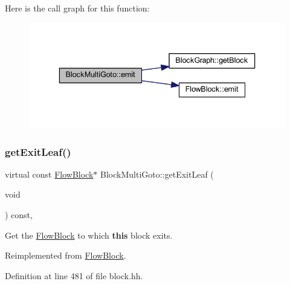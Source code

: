 Here is the call graph for this function\+:
\nopagebreak
\begin{figure}[H]
\begin{center}
\leavevmode
\includegraphics[width=336pt]{class_block_multi_goto_a8eee38e26a13873ceaff6d37b46eaafd_cgraph}
\end{center}
\end{figure}
\mbox{\label{class_block_multi_goto_a54ba810882911521ff2ca84b6458228a}} 
\subsubsection{\texorpdfstring{getExitLeaf()}{getExitLeaf()}}
{\footnotesize\ttfamily virtual const \mbox{\hyperlink{class_flow_block}{Flow\+Block}}$\ast$ Block\+Multi\+Goto\+::get\+Exit\+Leaf (\begin{DoxyParamCaption}\item[{void}]{ }\end{DoxyParamCaption}) const\hspace{0.3cm}{\ttfamily [inline]}, {\ttfamily [virtual]}}



Get the \mbox{\hyperlink{class_flow_block}{Flow\+Block}} to which {\bfseries{this}} block exits. 



Reimplemented from \mbox{\hyperlink{class_flow_block_a611bb926194635a0f5cfc0eb16cabe6a}{Flow\+Block}}.



Definition at line 481 of file block.\+hh.


